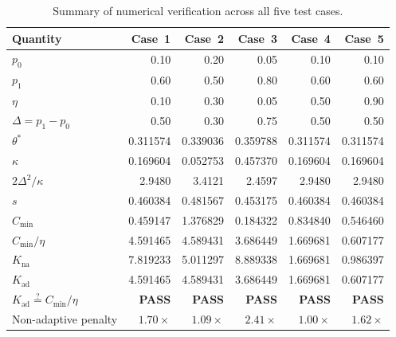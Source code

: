 \documentclass[article]{amsart}
\theoremstyle{definition}
\begin{document}
\begin{table}[htbp]
\centering
\caption{Summary of numerical verification across all five test cases.}
\label{tab:summary}
\begin{tabular}{lrrrrr}
\toprule
Quantity & Case~1 & Case~2 & Case~3 & Case~4 & Case~5 \\
\midrule
$p_0$ & 0.10 & 0.20 & 0.05 & 0.10 & 0.10 \\
$p_1$ & 0.60 & 0.50 & 0.80 & 0.60 & 0.60 \\
$\eta$ & 0.10 & 0.30 & 0.05 & 0.50 & 0.90 \\
$\Delta = p_1 - p_0$ & 0.50 & 0.30 & 0.75 & 0.50 & 0.50 \\
$\theta^*$ & 0.311574 & 0.339036 & 0.359788 & 0.311574 & 0.311574 \\
$\kappa$ & 0.169604 & 0.052753 & 0.457370 & 0.169604 & 0.169604 \\
$2\Delta^2 / \kappa$ & 2.9480 & 3.4121 & 2.4597 & 2.9480 & 2.9480 \\
$s$ & 0.460384 & 0.481567 & 0.453175 & 0.460384 & 0.460384 \\
$C_{\min}$ & 0.459147 & 1.376829 & 0.184322 & 0.834840 & 0.546460 \\
$C_{\min}/\eta$ & 4.591465 & 4.589431 & 3.686449 & 1.669681 & 0.607177 \\
$K_{\mathrm{na}}$ & 7.819233 & 5.011297 & 8.889338 & 1.669681 & 0.986397 \\
$K_{\mathrm{ad}}$ & 4.591465 & 4.589431 & 3.686449 & 1.669681 & 0.607177 \\
$K_{\mathrm{ad}} \stackrel{?}{=} C_{\min}/\eta$ & \textbf{PASS} & \textbf{PASS} & \textbf{PASS} & \textbf{PASS} & \textbf{PASS} \\
Non-adaptive penalty & $1.70\times$ & $1.09\times$ & $2.41\times$ & $1.00\times$ & $1.62\times$ \\
\bottomrule
\end{tabular}
\end{table}
\end{document}
